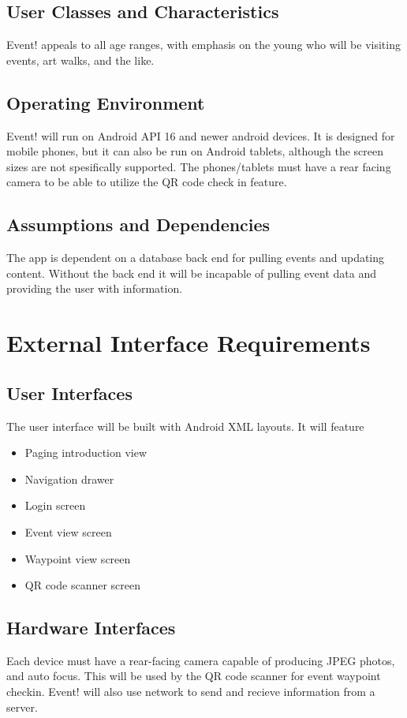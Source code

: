 \documentclass{scrreprt}
\begin{document}
\section{User Classes and Characteristics}
Event! appeals to all age ranges, with emphasis on the young who will be visiting 
events, art walks, and the like.

\section{Operating Environment}
Event! will run on Android API 16 and newer android devices. It is designed for 
mobile phones, but it can also be run on Android tablets, although the screen 
sizes are not spesifically supported. The phones/tablets must have a rear facing 
camera to be able to utilize the QR code check in feature.

\section{Assumptions and Dependencies}
The app is dependent on a database back end for pulling events and updating 
content. Without the back end it will be incapable of pulling event data and 
providing the user with information.


\chapter{External Interface Requirements}

\section{User Interfaces}

The user interface will be built with Android XML layouts. It will feature
\begin{itemize}
\item Paging introduction view
\item Navigation drawer
\item Login screen
\item Event view screen
\item Waypoint view screen
\item QR code scanner screen
\end{itemize}

\section{Hardware Interfaces}
Each device must have a rear-facing camera capable of producing JPEG photos, 
and auto focus. This will be used by the QR code scanner for event waypoint checkin.
Event! will also use network to send and recieve information from a server.
\end{document}
